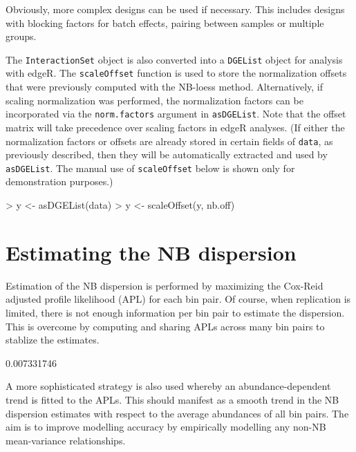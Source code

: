 \documentclass[12pt]{report}
\renewenvironment{Schunk}{\vspace{0pt}}{\vspace{0pt}}
\newcommand{\edgeR}{edgeR}
\newcommand{\code}[1]{{\small\texttt{#1}}}
\begin{document}
Obviously, more complex designs can be used if necessary.
This includes designs with blocking factors for batch effects, pairing between samples or multiple groups.

The \code{InteractionSet} object is also converted into a \code{DGEList} object for analysis with \edgeR{}.
The \code{scaleOffset} function is used to store the normalization offsets that were previously computed with the NB-loess method. 
Alternatively, if scaling normalization was performed, the normalization factors can be incorporated via the \code{norm.factors} argument in \code{asDGEList}.
Note that the offset matrix will take precedence over scaling factors in \edgeR{} analyses.
(If either the normalization factors or offsets are already stored in certain fields of \code{data}, as previously described, then they will be automatically extracted and used by \code{asDGEList}.
The manual use of \code{scaleOffset} below is shown only for demonstration purposes.)

\begin{Schunk}
\begin{Sinput}
> y <- asDGEList(data)
> y <- scaleOffset(y, nb.off)
\end{Sinput}
\end{Schunk}

\section{Estimating the NB dispersion}
Estimation of the NB dispersion is performed by maximizing the Cox-Reid adjusted profile likelihood (APL) \citep{mccarthy2012glm} for each bin pair.
Of course, when replication is limited, there is not enough information per bin pair to estimate the dispersion.
This is overcome by computing and sharing APLs across many bin pairs to stablize the estimates.

\begin{Schunk}
\begin{Soutput}
[1] 0.007331746
\end{Soutput}
\end{Schunk}

A more sophisticated strategy is also used whereby an abundance-dependent trend is fitted to the APLs.
This should manifest as a smooth trend in the NB dispersion estimates with respect to the average abundances of all bin pairs.
The aim is to improve modelling accuracy by empirically modelling any non-NB mean-variance relationships.
\end{document}
